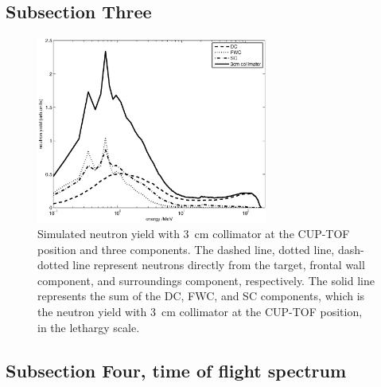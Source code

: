 \documentclass[12pt,journal]{IEEEtran}
\let\MYoriglatexcaption\caption
\renewcommand{\caption}[2][\relax]{\MYoriglatexcaption[#2]{#2}}
\begin{document}
\subsection{Subsection Three}
\begin{figure}[!t]
	\centering
	\includegraphics[width=3in]{TOF3Componentslinear.eps}
	\caption{Simulated neutron yield with \SI{3}{\cm} collimator at the CUP-TOF position and three components. The dashed line, dotted line, dash-dotted line represent neutrons directly from the target, frontal wall component, and surroundings component, respectively. The solid line represents the sum of the DC, FWC, and SC components, which is the neutron yield with \SI{3}{\cm} collimator at the CUP-TOF position, in the lethargy scale.}
	\label{fig:TOF3Componentslinear}
\end{figure}

\subsection{Subsection Four, time of flight spectrum}
\end{document}
